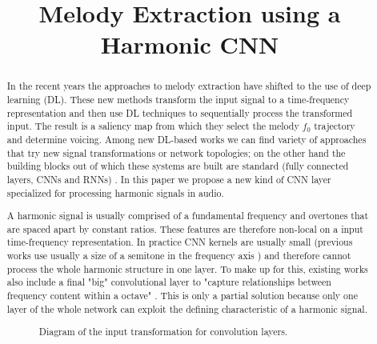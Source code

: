\documentclass[a4paper]{article} %
\title{Melody Extraction using a Harmonic CNN}
\begin{document}
\maketitle

\begin{abstract}


In the recent years the approaches to melody extraction have shifted to the use of deep learning (DL). These new methods transform the input signal to a time-frequency representation and then use DL techniques to sequentially process the transformed input. The result is a saliency map from which they select the melody $f_0$ trajectory and determine voicing. Among new DL-based works we can find variety of approaches that try new signal transformations or network topologies; on the other hand the building blocks out of which these systems are built are standard (fully connected layers, CNNs and RNNs) \cite{Kum2016,Rigaud2016,Bittner2017,DBasaranSEssid2018}. In this paper we propose a new kind of CNN layer specialized for processing harmonic signals in audio.

% 
A harmonic signal is usually comprised of a fundamental frequency and overtones that are spaced apart by constant ratios. These features are therefore non-local on a input time-frequency representation. In practice CNN kernels are usually small (previous works use usually a size of a semitone in the frequency axis \cite{Bittner2017,DBasaranSEssid2018}) and therefore cannot process the whole harmonic structure in one layer. To make up for this, existing works also include a final "big" convolutional layer to "capture relationships between frequency content within a octave" \cite{Bittner2017}. This is only a partial solution because only one layer of the whole network can exploit the defining characteristic of a harmonic signal.

\begin{figure}[H]
 \centerline{}
 \caption{Diagram of the input transformation for convolution layers.}
 \label{fig:hcnn_transform}
\end{figure}


\end{abstract}
\end{document}
